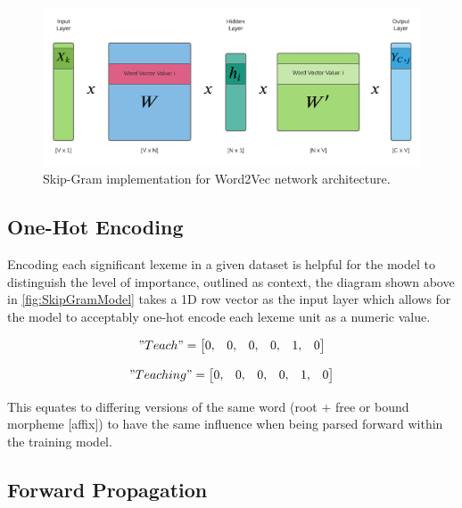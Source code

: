 \begin{figure}[H]
    \centering
    \includegraphics[width=\textwidth]{figures/chapter-5/SkipGramNetwork.pdf}
    \caption[SkipGramNetwork]{Skip-Gram implementation for Word2Vec network architecture.
    \label{fig:SkipGramNetwork}}
\end{figure}

\subsection{One-Hot Encoding}

Encoding each significant lexeme in a given dataset is helpful for the model to distinguish the level of importance, outlined as context, the diagram shown above in \autoref{fig:SkipGramModel} takes a 1D row vector as the input layer which allows for the model to acceptably one-hot encode each lexeme unit as a numeric value.

\begin{multicols}{2}
    \begin{equation*}
        "Teach" =
        \begin{bmatrix}
            0, & 0, & 0, & 0, & 1, & 0
        \end{bmatrix}
    \end{equation*}

    \begin{equation*}
        "Teaching" =
        \begin{bmatrix}
            0, & 0, & 0, & 0, & 1, & 0
        \end{bmatrix}
    \end{equation*}
\end{multicols}

This equates to differing versions of the same word (root + free or bound morpheme [affix]) to have the same influence when being parsed forward within the training model.

\subsection{Forward Propagation}

